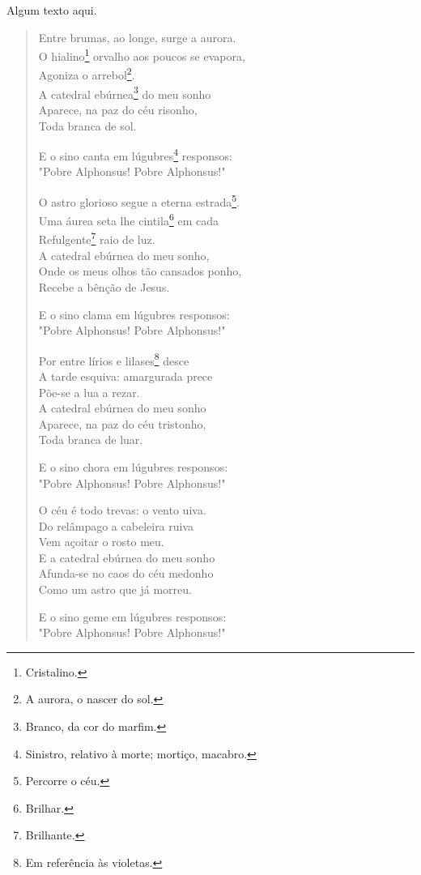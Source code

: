 Algum texto aqui.

\begin{verse}
Entre brumas, ao longe, surge a aurora. \\
O hialino\footnote{Cristalino.} orvalho aos poucos se evapora, \\
Agoniza o arrebol\footnote{A aurora, o nascer do sol.}. \\
A catedral ebúrnea\footnote{Branco, da cor do marfim.} do meu sonho \\
Aparece, na paz do céu risonho, \\
Toda branca de sol.

E o sino canta em lúgubres\footnote{Sinistro, relativo à morte; mortiço, macabro.} responsos: \\
"Pobre Alphonsus! Pobre Alphonsus!"

O astro glorioso segue a eterna estrada\footnote{Percorre o céu.}. \\
Uma áurea seta lhe cintila\footnote{Brilhar.} em cada \\
Refulgente\footnote{Brilhante.} raio de luz. \\
A catedral ebúrnea do meu sonho, \\
Onde os meus olhos tão cansados ponho, \\
Recebe a bênção de Jesus.

E o sino clama em lúgubres responsos: \\
"Pobre Alphonsus! Pobre Alphonsus!"

Por entre lírios e lilases\footnote{Em referência às violetas.} desce \\
A tarde esquiva: amargurada prece \\
Põe-se a lua a rezar. \\
A catedral ebúrnea do meu sonho \\
Aparece, na paz do céu tristonho, \\
Toda branca de luar.

E o sino chora em lúgubres responsos: \\
"Pobre Alphonsus! Pobre Alphonsus!"

O céu é todo trevas: o vento uiva. \\
Do relâmpago a cabeleira ruiva \\
Vem açoitar o rosto meu. \\
E a catedral ebúrnea do meu sonho \\
Afunda-se no caos do céu medonho \\
Como um astro que já morreu.

E o sino geme em lúgubres responsos: \\
"Pobre Alphonsus! Pobre Alphonsus!"
\end{verse}

